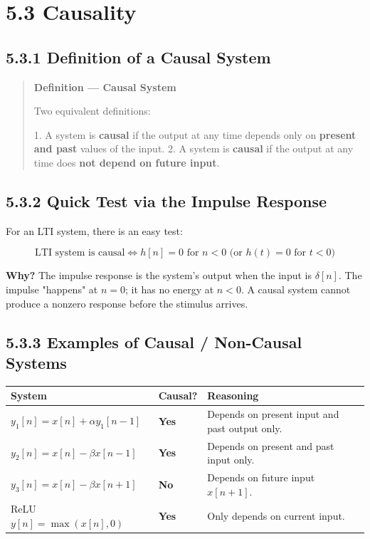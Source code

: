 \documentclass[11pt]{article}
\begin{document}
\section*{5.3 Causality}

\subsection*{5.3.1 Definition of a Causal System}

\begin{quote}
\textbf{Definition — Causal System}

Two equivalent definitions:

1. A system is \textbf{causal} if the output at any time depends only on \textbf{present and past} values of the input.
2. A system is \textbf{causal} if the output at any time does \textbf{not depend on future input}.
\end{quote}

\subsection*{5.3.2 Quick Test via the Impulse Response}

For an LTI system, there is an easy test:

\[\boxed{\,\text{LTI system is causal} \iff h[n] = 0 \text{ for } n < 0 \text{ (or } h(t) = 0 \text{ for } t < 0\text{)}\,}\]

\textbf{Why?} The impulse response is the system's output when the input is $\delta[n]$. The impulse "happens" at $n=0$; it has no energy at $n<0$. A causal system cannot produce a nonzero response before the stimulus arrives.

\subsection*{5.3.3 Examples of Causal / Non-Causal Systems}

\begin{center}
\begin{tabular}{|l|l|l|}
\hline
\textbf{System} & \textbf{Causal?} & \textbf{Reasoning} \\
\hline
$y_1[n] = x[n] + \alpha y_1[n-1]$ & \textbf{Yes} & Depends on present input and past output only. \\
\hline
$y_2[n] = x[n] - \beta x[n-1]$ & \textbf{Yes} & Depends on present and past input only. \\
\hline
$y_3[n] = x[n] - \beta x[n+1]$ & \textbf{No} & Depends on future input $x[n+1]$. \\
\hline
ReLU $y[n] = \max(x[n],0)$ & \textbf{Yes} & Only depends on current input. \\
\hline
\end{tabular}
\end{center}
\end{document}
